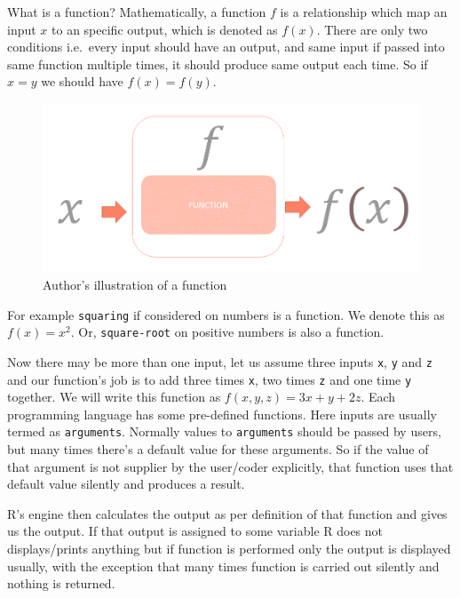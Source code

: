 \documentclass[
]{book}
\begin{document}
What is a function? Mathematically, a function \(f\) is a relationship which map an input \(x\) to an specific output, which is denoted as \(f(x)\). There are only two conditions i.e.~every input should have an output, and same input if passed into same function multiple times, it should produce same output each time. So if \(x=y\) we should have \(f(x)=f(y)\).

\begin{figure}

{\centering \includegraphics[width=0.99\linewidth]{images/function} 

}

\caption{Author's illustration of a function}\label{fig:unnamed-chunk-88}
\end{figure}

For example \texttt{squaring} if considered on numbers is a function. We denote this as \(f(x)=x^2\). Or, \texttt{square-root} on positive numbers is also a function.

Now there may be more than one input, let us assume three inputs \texttt{x}, \texttt{y} and \texttt{z} and our function's job is to add three times \texttt{x}, two times \texttt{z} and one time \texttt{y} together. We will write this function as \(f(x,y,z) = 3x+y+2z\). Each programming language has some pre-defined functions. Here inputs are usually termed as \texttt{arguments}. Normally values to \texttt{arguments} should be passed by users, but many times there's a default value for these arguments. So if the value of that argument is not supplier by the user/coder explicitly, that function uses that default value silently and produces a result.

R's engine then calculates the output as per definition of that function and gives us the output. If that output is assigned to some variable R does not displays/prints anything but if function is performed only the output is displayed usually, with the exception that many times function is carried out silently and nothing is returned.
\end{document}
